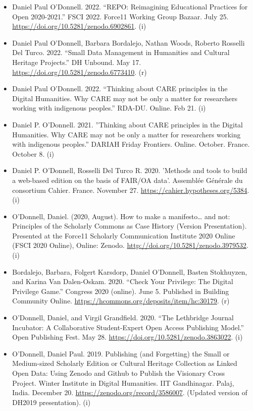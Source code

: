 \documentclass[12pt]{article}
\begin{document}
\begin{itemize}
  \item Daniel Paul O’Donnell. 2022. “REPO: Reimagining Educational Practices for Open 2020-2021.” FSCI 2022. Force11 Working Group Bazaar. July 25. \url{https://doi.org/10.5281/zenodo.6902861}. (i)
  \item Daniel Paul O’Donnell, Barbara Bordalejo, Nathan Woods, Roberto Rosselli Del Turco. 2022. “Small Data Management in Humanities and Cultural Heritage Projects.” DH Unbound. May 17. \url{https://doi.org/10.5281/zenodo.6773410}. (r)
  \item Daniel Paul O’Donnell. 2022. “Thinking about CARE principles in the Digital Humanities.  Why CARE may not be only a matter for researchers working with indigenous peoples.” RDA-DU. Online. Feb 21. (i)
  \item Daniel P. O'Donnell. 2021. ''Thinking about CARE principles in the Digital Humanities. Why CARE may not be only a matter for researchers working with indigenous peoples.” DARIAH Friday Frontiers. Online. October. France. October 8. (i)
  \item Daniel P. O'Donnell, Rosselli Del Turco R. 2020. 'Methods and tools to build a web-based edition on the basis of FAIR/OA data'. Assemblée Générale du consortium Cahier. France. November 27. \url{https://cahier.hypotheses.org/5384}. (i)
  \item O'Donnell, Daniel. (2020, August). How to make a manifesto… and not: Principles of the Scholarly Commons as Case History (Version Presentation). Presented at the Force11 Scholarly Communication Institute 2020 Online (FSCI 2020 Online), Online: Zenodo. \url{http://doi.org/10.5281/zenodo.3979532}. (i)
  \item Bordalejo, Barbara, Folgert Karsdorp, Daniel O'Donnell, Basten Stokhuyzen, and Karina Van Dalen-Oskam. 2020. “Check Your Privilege: The Digital Privilege Game.” Congress 2020 (online). June 5. Published in Building Community Online. \url{https://hcommons.org/deposits/item/hc:30179}. (r)
  \item O’Donnell, Daniel, and Virgil Grandfield. 2020. “The Lethbridge Journal Incubator: A Collaborative Student-Expert Open Access Publishing Model.” Open Publishing Fest. May 28. \url{https://doi.org/10.5281/zenodo.3863022}. (i)
  \item O’Donnell, Daniel Paul. 2019. Publishing (and Forgetting) the Small or Medium-sized Scholarly Edition or Cultural Heritage Collection as Linked Open Data: Using Zenodo and Github to Publish the Visionary Cross Project. Winter Institute in Digital Humanities. IIT Gandhinagar. Palaj, India. December 20. \url{https://zenodo.org/record/3586007}. (Updated version of DH2019 presentation). (i)

\end{itemize}
\end{document}
